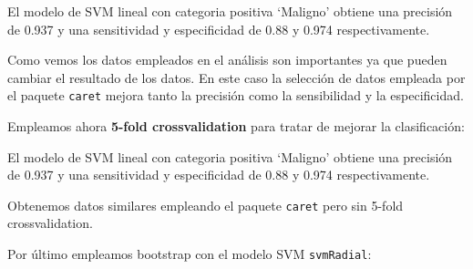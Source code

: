 \documentclass[
]{article}
\newenvironment{Shaded}{\begin{snugshade}}{\end{snugshade}}
\newcommand{\CommentTok}[1]{\textcolor[rgb]{0.56,0.35,0.01}{\textit{#1}}}
\newcommand{\DataTypeTok}[1]{\textcolor[rgb]{0.13,0.29,0.53}{#1}}
\newcommand{\DecValTok}[1]{\textcolor[rgb]{0.00,0.00,0.81}{#1}}
\newcommand{\KeywordTok}[1]{\textcolor[rgb]{0.13,0.29,0.53}{\textbf{#1}}}
\newcommand{\NormalTok}[1]{#1}
\newcommand{\OperatorTok}[1]{\textcolor[rgb]{0.81,0.36,0.00}{\textbf{#1}}}
\newcommand{\OtherTok}[1]{\textcolor[rgb]{0.56,0.35,0.01}{#1}}
\newcommand{\StringTok}[1]{\textcolor[rgb]{0.31,0.60,0.02}{#1}}
\begin{document}
El modelo de SVM lineal con categoria positiva `Maligno' obtiene una
precisión de 0.937 y una sensitividad y especificidad de 0.88 y 0.974
respectivamente.

Como vemos los datos empleados en el análisis son importantes ya que
pueden cambiar el resultado de los datos. En este caso la selección de
datos empleada por el paquete \texttt{caret} mejora tanto la precisión
como la sensibilidad y la especificidad.

Empleamos ahora \textbf{5-fold crossvalidation} para tratar de mejorar
la clasificación:

\begin{Shaded}
\end{Shaded}

El modelo de SVM lineal con categoria positiva `Maligno' obtiene una
precisión de 0.937 y una sensitividad y especificidad de 0.88 y 0.974
respectivamente.

Obtenemos datos similares empleando el paquete \texttt{caret} pero sin
5-fold crossvalidation.

Por último empleamos bootstrap con el modelo SVM \texttt{svmRadial}:
\end{document}
